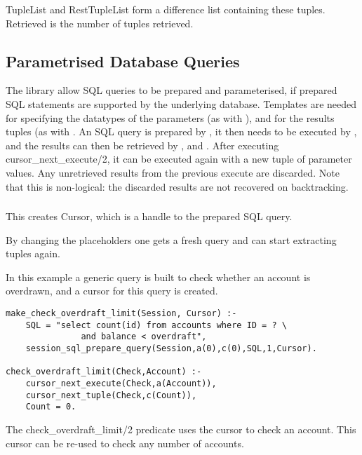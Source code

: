 TupleList and RestTupleList form a difference list containing these
tuples. Retrieved is the number of tuples retrieved.


\subsection{Parametrised Database Queries}

\begin{sloppypar}
The library allow SQL queries to be prepared and parameterised, if prepared
SQL statements are supported by the underlying database. Templates are needed
for specifying the datatypes of the parameters (as with
),
and for the results tuples (as with . An SQL query
is prepared by
,
it then needs to be executed by
,
and the results can then be retrieved by ,
 and
. After
executing cursor_next_execute/2, it can be executed again with a new tuple
of parameter values. Any unretrieved results from the previous execute are
discarded. Note that this is non-logical: the discarded results are not
recovered on backtracking.
\end{sloppypar}

\subsubsection
{}
\label{session-prepare-sql-query/5}

This creates Cursor, which is a handle to the prepared SQL query.

By changing the placeholders one gets a fresh query and can start extracting
tuples again.


In this example a generic query is built to check whether an account is
overdrawn, and a cursor for this query is created.
\begin{verbatim}
make_check_overdraft_limit(Session, Cursor) :-
    SQL = "select count(id) from accounts where ID = ? \
               and balance < overdraft",
    session_sql_prepare_query(Session,a(0),c(0),SQL,1,Cursor).

check_overdraft_limit(Check,Account) :-
    cursor_next_execute(Check,a(Account)),
    cursor_next_tuple(Check,c(Count)),
    Count = 0.
\end{verbatim}
The check_overdraft_limit/2 predicate uses the cursor to check an account.
This cursor can be re-used to check any number of accounts.


